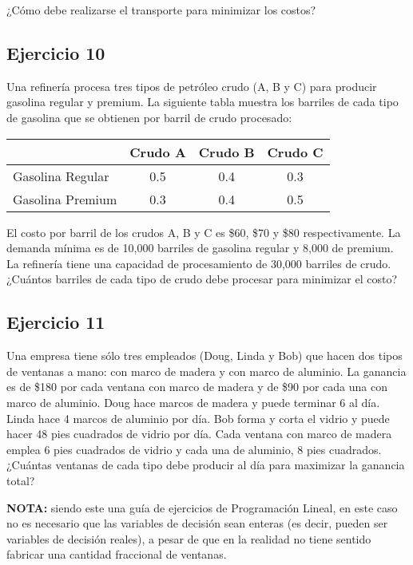 \documentclass[12pt]{article}
\begin{document}
¿Cómo debe realizarse el transporte para minimizar los costos?

\subsection{Ejercicio 10}

Una refinería procesa tres tipos de petróleo crudo (A, B y C) para producir gasolina regular y premium. La siguiente tabla muestra los barriles de cada tipo de gasolina que se obtienen por barril de crudo procesado:

\begin{center}
\begin{tabular}{lccc}
\toprule
& Crudo A & Crudo B & Crudo C \\
\midrule
Gasolina Regular & 0.5 & 0.4 & 0.3 \\
Gasolina Premium & 0.3 & 0.4 & 0.5 \\
\bottomrule
\end{tabular}
\end{center}

El costo por barril de los crudos A, B y C es \$60, \$70 y \$80 respectivamente. La demanda mínima es de 10,000 barriles de gasolina regular y 8,000 de premium. La refinería tiene una capacidad de procesamiento de 30,000 barriles de crudo. ¿Cuántos barriles de cada tipo de crudo debe procesar para minimizar el costo?

\subsection{Ejercicio 11}

Una empresa tiene sólo tres empleados (Doug, Linda y Bob) que hacen dos tipos de ventanas a mano: con marco de madera y con marco de aluminio. La ganancia es de \$180 por cada ventana con marco de madera y de \$90 por cada una con marco de aluminio. Doug hace marcos de madera y puede terminar 6 al día. Linda hace 4 marcos de aluminio por día. Bob forma y corta el vidrio y puede hacer 48 pies cuadrados de vidrio por día. Cada ventana con marco de madera emplea 6 pies cuadrados de vidrio y cada una de aluminio, 8 pies cuadrados. ¿Cuántas ventanas de cada tipo debe producir al día para maximizar la ganancia total?

\textbf{NOTA:} siendo este una guía de ejercicios de Programación Lineal, en este caso no es necesario que las variables de decisión sean enteras (es decir, pueden ser variables de decisión reales), a pesar de que en la realidad no tiene sentido fabricar una cantidad fraccional de ventanas.
\end{document}
